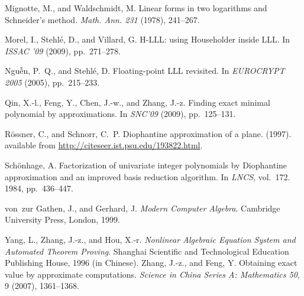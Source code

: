 \documentclass{sig-alternate}
\numberwithin{theorem}{section} \numberwithin{equation}{section}
\begin{document}
\begin{thebibliography}{10}
{\sc Mignotte, M., and Waldschmidt, M.}
  Linear forms in two logarithms and Schneider's method.
  {\em Math. Ann. 231\/} (1978), 241--267.

{\sc Morel, I., Stehl{\'e}, D., and Villard, G.}
  H-LLL: using Householder inside LLL.
  In {\em ISSAC '09\/} (2009), pp.~271--278.

{\sc Ngu{\~{\^e}}n, P.~Q., and Stehl{\'e}, D.}
  Floating-point LLL revisited.
  In {\em EUROCRYPT 2005\/} (2005), pp.~215--233.

{\sc Qin, X.-l., Feng, Y., Chen, J.-w., and Zhang, J.-z.}
  Finding exact minimal polynomial by approximations.
  In {\em SNC'09\/} (2009), pp.~125--131.

{\sc R{\"o}ssner, C., and Schnorr, C.~P.}
  Diophantine approximation of a plane. (1997).
  available from \url{http://citeseer.ist.psu.edu/193822.html}.

{\sc Sch{\"o}nhage, A.}
  Factorization of univariate integer polynomials by Diophantine
  approximation and an improved basis reduction algorithm.
  In {\em LNCS}, vol.~172. 1984, pp.~436--447.



{\sc von~zur Gathen, J., and Gerhard, J.}
  {\em Modern Computer Algebra}.
  Cambridge University Press, London, 1999.

{\sc Yang, L., Zhang, J.-z., and Hou, X.-r.}
  {\em Nonlinear Algebraic Equation System and Automated Theorem
  Proving}.
  Shanghai Scientific and Technological Education Publishing House,
  1996 (in Chinese).
{\sc Zhang, J.-z., and Feng, Y.}
  Obtaining exact value by approximate computations.
  {\em Science in China Series A: Mathematics 50}, 9 (2007),
  1361--1368.

\end{thebibliography}

\balance
\end{document}
